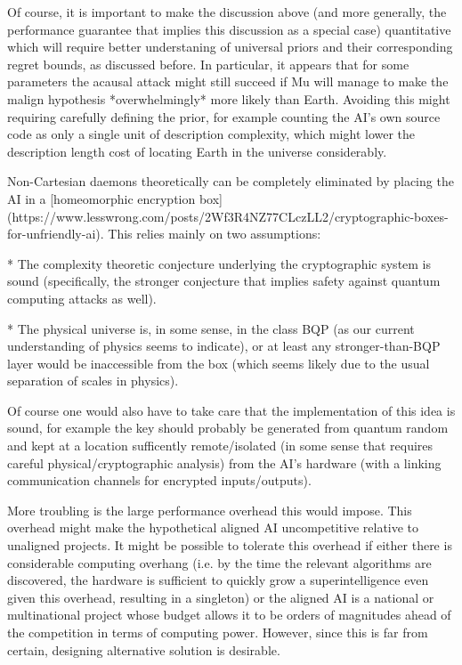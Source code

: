 \documentclass[a4paper]{article}
\begin{document}
Of course, it is important to make the discussion above (and more generally, the performance guarantee that implies this discussion as a special case) quantitative which will require better understaning of universal priors and their corresponding regret bounds, as discussed before. In particular, it appears that for some parameters the acausal attack might still succeed if Mu will manage to make the malign hypothesis *overwhelmingly* more likely than Earth. Avoiding this might requiring carefully defining the prior, for example counting the AI's own source code as only a single unit of description complexity, which might lower the description length cost of locating Earth in the universe considerably.

Non-Cartesian daemons theoretically can be completely eliminated by placing the AI in a [homeomorphic encryption box](https://www.lesswrong.com/posts/2Wf3R4NZ77CLczLL2/cryptographic-boxes-for-unfriendly-ai). This relies mainly on two assumptions:

* The complexity theoretic conjecture underlying the cryptographic system is sound (specifically, the stronger conjecture that implies safety against quantum computing attacks as well).

* The physical universe is, in some sense, in the class BQP (as our current understanding of physics seems to indicate), or at least any stronger-than-BQP layer would be inaccessible from the box (which seems likely due to the usual separation of scales in physics).

Of course one would also have to take care that the implementation of this idea is sound, for example the key should probably be generated from quantum random and kept at a location sufficently remote/isolated (in some sense that requires careful physical/cryptographic analysis) from the AI's hardware (with a linking communication channels for encrypted inputs/outputs).

More troubling is the large performance overhead this would impose. This overhead might make the hypothetical aligned AI uncompetitive relative to unaligned projects. It might be possible to tolerate this overhead if either there is considerable computing overhang (i.e. by the time the relevant algorithms are discovered, the hardware is sufficient to quickly grow a superintelligence even given this overhead, resulting in a singleton) or the aligned AI is a national or multinational project whose budget allows it to be orders of magnitudes ahead of the competition in terms of computing power. However, since this is far from certain, designing alternative solution is desirable.
\end{document}
